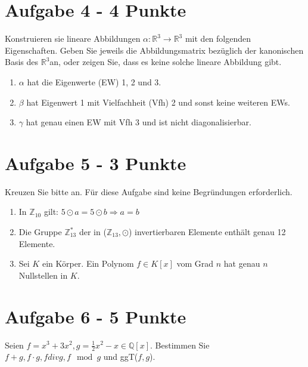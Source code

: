 \section*{Aufgabe 4 - 4 Punkte}
Konstruieren sie lineare Abbildungen $\alpha: \mathbb{R}^3 \rightarrow \mathbb{R}^3$ mit den folgenden Eigenschaften.
Geben Sie jeweils die Abbildungsmatrix bezüglich der kanonischen Basis des $\mathbb{R}^3$an, oder zeigen Sie, dass es keine solche lineare Abbildung gibt.
  \begin{enumerate}[label=\alph*)]
    \item $\alpha$ hat die Eigenwerte (EW) 1, 2 und 3.
    \item $\beta$ hat Eigenwert 1 mit Vielfachheit (Vfh) 2 und sonst keine weiteren EWs.
    \item $\gamma$ hat genau einen EW mit Vfh 3 und ist nicht diagonalisierbar.
  \end{enumerate}
\section*{Aufgabe 5 - 3 Punkte}
 Kreuzen Sie bitte an. Für diese Aufgabe sind keine Begründungen erforderlich.
   \begin{enumerate}[label=\alph*)]
    \item In $\mathbb{Z}_{10}$ gilt: $5 \odot a = 5 \odot b \Rightarrow a = b$
    \item Die Gruppe $\mathbb{Z}_{13}^{*}$ der in ($\mathbb{Z}_{13}, \odot$) invertierbaren Elemente enthält genau 12 Elemente.
    \item Sei $K$ ein Körper. Ein Polynom $f \in K[x]$ vom Grad $n$ hat genau $n$ Nullstellen in $K$.
  \end{enumerate}
\section*{Aufgabe 6 - 5 Punkte}
Seien $f = x^3 + 3x^2 , g = \frac{1}{2}x^2 - x \in \mathbb{Q} [x]$. Bestimmen Sie $f+g, f\cdot g, f div g, f \mod g$ und ggT($f,g$).

